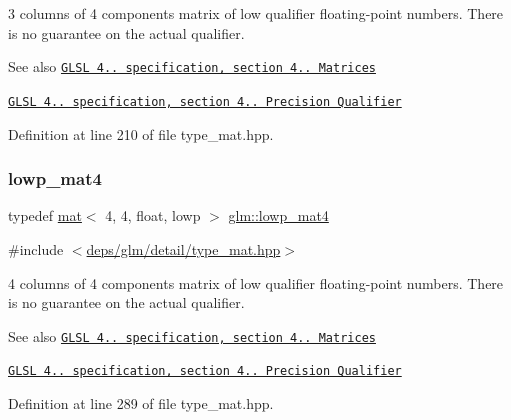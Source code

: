 3 columns of 4 components matrix of low qualifier floating-\/point numbers. There is no guarantee on the actual qualifier.

\begin{DoxySeeAlso}{See also}
\href{http://www.opengl.org/registry/doc/GLSLangSpec.4.20.8.pdf}{\tt G\+L\+SL 4.. specification, section 4.. Matrices} 

\href{http://www.opengl.org/registry/doc/GLSLangSpec.4.20.8.pdf}{\tt G\+L\+SL 4.. specification, section 4.. Precision Qualifier} 
\end{DoxySeeAlso}


Definition at line 210 of file type\+\_\+mat.\+hpp.

\mbox{\label{group__core__precision_ga692c14e84ad690b182373bec9fdf1ab9}} 
\subsubsection{\texorpdfstring{lowp\+\_\+mat4}{lowp\_mat4}}
{\footnotesize\ttfamily typedef \hyperlink{structglm_1_1mat}{mat}$<$ 4, 4, float, lowp $>$ \hyperlink{group__core__precision_ga692c14e84ad690b182373bec9fdf1ab9}{glm\+::lowp\+\_\+mat4}}



{\ttfamily \#include $<$\hyperlink{type__mat_8hpp}{deps/glm/detail/type\+\_\+mat.\+hpp}$>$}

4 columns of 4 components matrix of low qualifier floating-\/point numbers. There is no guarantee on the actual qualifier.

\begin{DoxySeeAlso}{See also}
\href{http://www.opengl.org/registry/doc/GLSLangSpec.4.20.8.pdf}{\tt G\+L\+SL 4.. specification, section 4.. Matrices} 

\href{http://www.opengl.org/registry/doc/GLSLangSpec.4.20.8.pdf}{\tt G\+L\+SL 4.. specification, section 4.. Precision Qualifier} 
\end{DoxySeeAlso}


Definition at line 289 of file type\+\_\+mat.\+hpp.

\mbox{\label{group__core__precision_gacd6c35b61e9de6ad39767ea58660a602}} 
